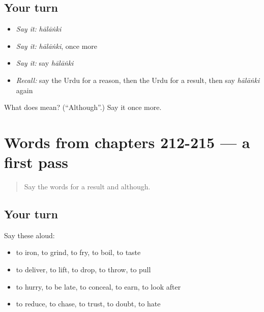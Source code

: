 \subsection*{Your turn}
\begin{itemize}
\raggedright
  \item \emph{Say it:} \emph{hālāṅki}
  \item \emph{Say it:} \emph{hālāṅki}, once more
  \item \emph{Say it:} say \emph{hālāṅki}
  \item \emph{Recall:} say the Urdu for a reason, then the Urdu for a result, then say \emph{hālāṅki} again
\end{itemize}

\begin{tcolorbox}[breakable,colback=teal!4,colframe=teal!35!black,title={Before you move on}]
What does  mean? (\textquotedblleft{}Although\textquotedblright{}.) Say it once more.
\end{tcolorbox}
\section[(dialogue)]{Words from chapters 212-215 — a first pass}

\label{lesson:UR-R220-first-pass-words-from-chapters-212-215}



\begin{quote}
Say the words for a result and although.
\end{quote}

\subsection*{Your turn}
Say these aloud:

\begin{itemize}
\raggedright
  \item to iron, to grind, to fry, to boil, to taste
  \item to deliver, to lift, to drop, to throw, to pull
  \item to hurry, to be late, to conceal, to earn, to look after
  \item to reduce, to chase, to trust, to doubt, to hate
\end{itemize}


